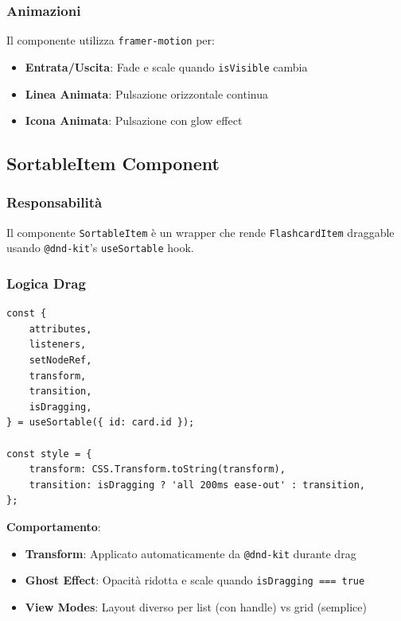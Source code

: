 \documentclass[11pt,a4paper]{article}
\begin{document}
\subsubsection{Animazioni}

Il componente utilizza \texttt{framer-motion} per:
\begin{itemize}
    \item \textbf{Entrata/Uscita}: Fade e scale quando \texttt{isVisible} cambia
    \item \textbf{Linea Animata}: Pulsazione orizzontale continua
    \item \textbf{Icona Animata}: Pulsazione con glow effect
\end{itemize}

\subsection{SortableItem Component}

\subsubsection{Responsabilità}

Il componente \texttt{SortableItem} è un wrapper che rende \texttt{FlashcardItem} draggable usando \texttt{@dnd-kit}'s \texttt{useSortable} hook.

\subsubsection{Logica Drag}

\begin{lstlisting}[style=typescript, caption=useSortable Hook]
const {
    attributes,
    listeners,
    setNodeRef,
    transform,
    transition,
    isDragging,
} = useSortable({ id: card.id });

const style = {
    transform: CSS.Transform.toString(transform),
    transition: isDragging ? 'all 200ms ease-out' : transition,
};
\end{lstlisting}

\textbf{Comportamento}:
\begin{itemize}
    \item \textbf{Transform}: Applicato automaticamente da \texttt{@dnd-kit} durante drag
    \item \textbf{Ghost Effect}: Opacità ridotta e scale quando \texttt{isDragging === true}
    \item \textbf{View Modes}: Layout diverso per list (con handle) vs grid (semplice)
\end{itemize}
\end{document}
